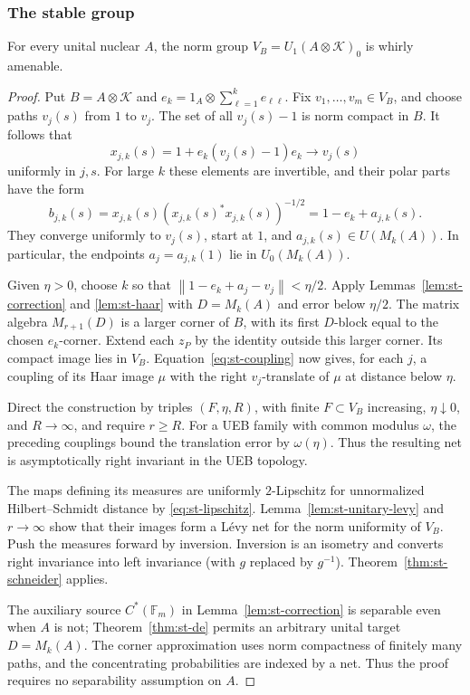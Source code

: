 \subsubsection{The stable group}
\begin{theorem}\label{thm:st-v}
For every unital nuclear \(A\), the norm group
\(V_B=U_1(A\otimes\mathcal K)_0\) is whirly amenable.
\end{theorem}
\begin{proof}
Put \(B=A\otimes\mathcal K\) and
\(e_k=1_A\otimes\sum_{\ell=1}^k e_{\ell\ell}\).
Fix \(v_1,\ldots,v_m\in V_B\), and choose paths \(v_j(s)\) from
\(1\) to \(v_j\). The set of all \(v_j(s)-1\) is norm compact in \(B\).
It follows that
\[
 x_{j,k}(s)=1+e_k(v_j(s)-1)e_k\longrightarrow v_j(s)
\]
uniformly in \(j,s\). For large \(k\) these elements are invertible,
and their polar parts have the form
\[
 b_{j,k}(s)=x_{j,k}(s)(x_{j,k}(s)^*x_{j,k}(s))^{-1/2}
          =1-e_k+a_{j,k}(s).
\]
They converge uniformly to \(v_j(s)\), start at \(1\), and
\(a_{j,k}(s)\in U(M_k(A))\). In particular, the endpoints
\(a_j=a_{j,k}(1)\) lie in \(U_0(M_k(A))\).

Given \(\eta>0\), choose \(k\) so that
\(\left\|1-e_k+a_j-v_j\right\|<\eta/2\).
Apply Lemmas~\ref{lem:st-correction} and \ref{lem:st-haar} with
\(D=M_k(A)\) and error below \(\eta/2\).
The matrix algebra \(M_{r+1}(D)\) is a larger corner of \(B\), with
its first \(D\)-block equal to the chosen \(e_k\)-corner.
Extend each \(z_P\) by the identity outside this larger corner.
Its compact image lies in \(V_B\).
Equation~\eqref{eq:st-coupling} now gives, for each \(j\), a coupling
of its Haar image \(\mu\) with the right \(v_j\)-translate of \(\mu\)
at distance below \(\eta\).

Direct the construction by triples \((F,\eta,R)\), with finite
\(F\subset V_B\) increasing, \(\eta\downarrow0\), and \(R\to\infty\),
and require \(r\geq R\). For a UEB family with common modulus
\(\omega\), the preceding couplings bound the translation error
by \(\omega(\eta)\). Thus the resulting net is asymptotically right
invariant in the UEB topology.

The maps defining its measures are uniformly \(2\)-Lipschitz for
unnormalized Hilbert--Schmidt distance by
\eqref{eq:st-lipschitz}. Lemma~\ref{lem:st-unitary-levy} and \(r\to\infty\)
show that their images form a L\'evy net for the norm uniformity
of \(V_B\). Push the measures forward by inversion.
Inversion is an isometry and converts right invariance into left
invariance (with \(g\) replaced by \(g^{-1}\)).
Theorem~\ref{thm:st-schneider} applies.

The auxiliary source \(C^*(\mathbb F_m)\) in Lemma~\ref{lem:st-correction}
is separable even when \(A\) is not; Theorem~\ref{thm:st-de} permits an
arbitrary unital target \(D=M_k(A)\). The corner approximation uses
norm compactness of finitely many paths, and the concentrating
probabilities are indexed by a net. Thus the proof requires no
separability assumption on \(A\).
\end{proof}

